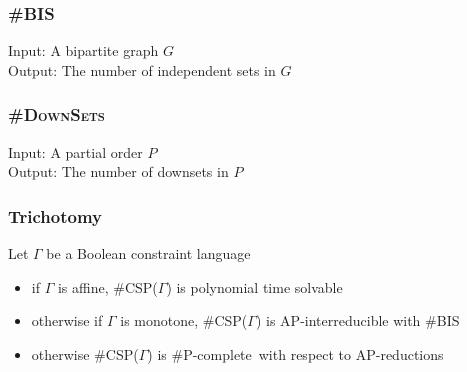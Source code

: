 \documentclass[a4paper,handout]{beamer}
\newcommand{\pname}[1]{\textsc{#1}}
\newcommand{\ccsp}{\#CSP}
\newcommand{\cbis}{\#\textsc{BIS}}
\newcommand{\cdsp}{\pname{\#DownSets}}
\newcommand{\cpc}{\#P-complete}
\theoremstyle{definition}
\begin{document}
\begin{frame}
\frametitle{\cbis}
\begin{center}
\end{center}

\begin{definition}[\cbis]
Input: A bipartite graph \(G\)\\
Output: The number of independent sets in \(G\)
\end{definition}
\end{frame}

\begin{frame}
\frametitle{\cdsp}
\begin{center}
\end{center}

\begin{definition} [\cdsp]
Input: A partial order \(P\) \\
Output: The number of downsets in \(P\)
\end{definition}
\end{frame}

\begin{frame}
\frametitle{Trichotomy}
\begin{theorem} 
Let \(\Gamma\) be a Boolean constraint language\\
\begin{itemize}
\item if \(\Gamma\) is affine, \ccsp(\(\Gamma\)) is polynomial time solvable
\item otherwise if \(\Gamma\) is monotone, \ccsp(\(\Gamma\)) is AP-interreducible with \cbis
\item otherwise \ccsp(\(\Gamma\)) is \cpc\ with respect to AP-reductions
\end{itemize}
\end{theorem}
\end{frame}
\end{document}

